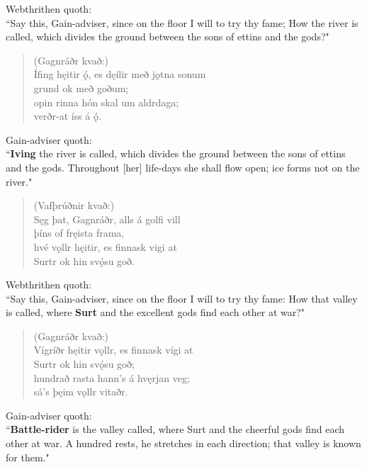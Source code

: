 \bvb Webthrithen quoth: \\ “Say this, Gain-adviser, since on the floor I will to try thy fame; How the river is called, which divides the ground between the sons of ettins and the gods?" \\

\begin{verse}
(Gagnráðr kvað:) \\%
\bva Ífing hęitir ǫ́, \hld es dęilir með jǫtna sonum \\%
\ind grund ok með goðum; \\%
opin rinna \hld hón skal um aldrdaga; \\%
\ind verðr-at íss á ǫ́.\\%
\end{verse}

\bvb Gain-adviser quoth: \\ “\textbf{Iving} the river is called, which divides the ground between the sons of ettins and the gods. Throughout [her] life-days she shall flow open; ice forms not on the river." \\

\begin{verse}
(Vafþrúðnir kvað:) \\%
\bva Sęg þat, Gagnráðr, \hld alls á golfi vill \\%
\ind þíns of fręista frama, \\%
hvé vǫllr hęitir, \hld es finnask vigi at \\%
\ind Surtr ok hin svǫ́su goð.\\%
\end{verse}

\bvb Webthrithen quoth: \\ “Say this, Gain-adviser, since on the floor I will to try thy fame: How that valley is called, where \textbf{Surt} and the excellent gods find each other at war?" \\

\begin{verse}
(Gagnráðr kvað:) \\%
\bva Vígríðr hęitir vǫllr, \hld es finnask vígi at \\%
\ind Surtr ok hin svǫ́su goð; \\%
hundrað rasta \hld hann's á hvęrjan veg; \\%
\ind sá's þęim vǫllr vitaðr.\\%
\end{verse}

\bvb Gain-adviser quoth: \\ “\textbf{Battle-rider} is the valley called, where Surt and the cheerful gods find each other at war. A hundred rests\footnotemark[30], he stretches in each direction; that valley is known for them.\footnotemark[31]" \\


